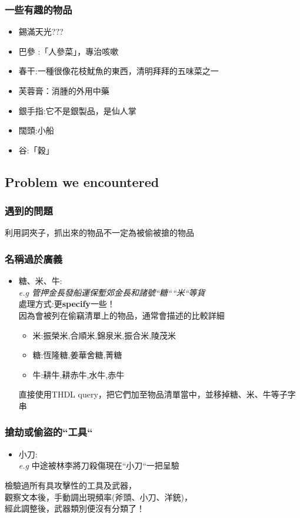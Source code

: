 \documentclass{beamer}
\begin{document}
\begin{frame}
    \frametitle{一些有趣的物品}
    \begin{itemize}
        \item 錫滿天光???
        \item 巴參 :「人參菜」，專治咳嗽
        \item 春干:一種很像花枝魷魚的東西，清明拜拜的五味菜之一
        \item 芙蓉膏：消腫的外用中藥
        \item 銀手指:它不是銀製品，是仙人掌
        \item 闊頭:小船
        \item 谷:「穀」
    \end{itemize}
\end{frame}

\subsection{Problem we encountered}

\begin{frame}
\frametitle{遇到的問題}
    利用詞夾子，抓出來的物品不一定為被偷被搶的物品
\end{frame}

\begin{frame}
\frametitle{名稱過於廣義}
\begin{itemize}
    \item 糖、米、牛:\\
    \textit{e.g 管押金長發船運保塹郊金長和諸號``糖````米``等貨}\\
    \MVRightarrow{}處理方式:更\textbf{specify}一些！\\
    因為會被列在偷竊清單上的物品，通常會描述的比較詳細
    \begin{itemize}
        \item 米:振榮米,合順米,錦泉米,振合米,陵茂米
        \item 糖:恆隆糖,姜華舍糖,菁糖
        \item 牛:耕牛,耕赤牛,水牛,赤牛
    \end{itemize}
    \MVRightarrow{}直接使用THDL query，把它們加至物品清單當中，並移掉糖、米、牛等子字串
\end{itemize}
\end{frame}

\begin{frame}
\frametitle{搶劫或偷盜的``工具``}
\begin{itemize}
    \item 小刀:\\
    \textit{e.g} 中途被林李將刀殺傷現在``小刀``一把呈驗
\end{itemize}
檢驗過所有具攻擊性的工具及武器，\\
觀察文本後，手動調出現頻率(斧頭、小刀、洋銃)，\\
經此調整後，武器類別便沒有分類了！
\end{frame}
\end{document}
